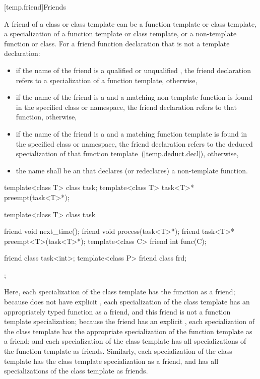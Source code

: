 [temp.friend]{Friends}

\pnum
{}%
A friend of a class or class template can be a function template or
class template, a specialization of a function template or class
template, or a non-template function or class.
For a friend function declaration that is not a template declaration:

\begin{itemize}
\item
if the name of the friend is a qualified or unqualified ,
the friend declaration refers to a specialization of a function
template, otherwise,
\item
if the name of the friend is a  and a matching non-template
function is found in the specified class or namespace, the friend
declaration refers to that function, otherwise,
\item
if the name of the friend is a  and a matching
function template
is found in the specified class
or namespace, the friend declaration refers to
the deduced specialization of that function template~(\ref{temp.deduct.decl}), otherwise,
\item
the name shall be an  that declares (or redeclares) a
non-template function.
\end{itemize}

\begin{example}
\begin{codeblock}
template<class T> class task;
template<class T> task<T>* preempt(task<T>*);

template<class T> class task {
  friend void next_time();
  friend void process(task<T>*);
  friend task<T>* preempt<T>(task<T>*);
  template<class C> friend int func(C);

  friend class task<int>;
  template<class P> friend class frd;
};
\end{codeblock}

Here,
each specialization of the
class template has the function
as a friend;
because
does not have explicit
,
each specialization of the
class template has an appropriately typed function
as a friend, and this friend is not a function template specialization;
because the friend
has an explicit
,
each specialization of the
class template has the appropriate specialization of the function
template
as a friend;
and each specialization of the
class template has all specializations of the function template
as friends.
Similarly,
each specialization of the
class template has the class template specialization
as a friend, and has all specializations of the class template
as friends.
\end{example}

